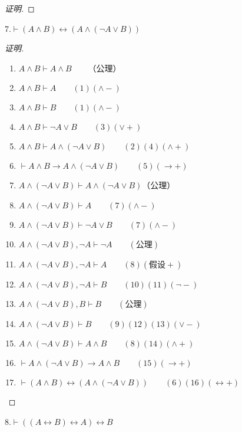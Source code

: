 \documentclass{article}
\begin{document}
\begin{CJK*}{UTF8}{gbsn}
\begin{proof}[证明]
    \end{proof}
    
    7.$\vdash (A\land B)\leftrightarrow (A\land (\lnot A\lor B))$
    
    \begin{proof}[证明]
      
      $\quad$

      \begin{enumerate}
        \item  $A\land B\vdash A\land B\qquad$（公理）
        \item $A\land B\vdash A\qquad (1)(\land -)$
        \item $A\land B\vdash B\qquad (1)(\land -)$
        \item $A\land B\vdash \lnot A\lor B\qquad(3)(\lor +)$
        \item $A\land B\vdash A\land (\lnot A\lor B)\qquad(2)(4)(\land +)$
        \item $\vdash A\land B\to A\land (\lnot A\lor B)\qquad(5)(\to +)$
        \item $A\land (\lnot A\lor B)\vdash A\land (\lnot A\lor B)$（公理）
        \item $A\land (\lnot A\lor B)\vdash A\qquad (7)(\land -)$
        \item $A\land (\lnot A\lor B)\vdash \lnot A\lor B\qquad (7)(\land -)$
        \item $A\land (\lnot A\lor B), \lnot A\vdash \lnot A\qquad(\text{公理})$
        \item $A\land (\lnot A\lor B), \lnot A\vdash A\qquad(8)(\text{假设} +)$
        \item $A\land (\lnot A\lor B), \lnot A\vdash B\qquad(10)(11)(\lnot -)$
        \item $A\land (\lnot A\lor B), B\vdash B\qquad(\text{公理})$
        \item $A\land (\lnot A\lor B)\vdash B\qquad(9)(12)(13)(\lor -)$
        \item $A\land (\lnot A\lor B)\vdash A\land B\qquad(8)(14)(\land +)$
        \item $\vdash A\land (\lnot A\lor B)\to A\land B\qquad(15)(\to +)$
        \item $\vdash (A\land B)\leftrightarrow (A\land (\lnot A\lor B)) \qquad (6)(16)(\leftrightarrow +)$
      \end{enumerate}

    \end{proof}
    
    8.$\vdash ((A\leftrightarrow B)\leftrightarrow A)\leftrightarrow B$


\end{CJK*}
\end{document}
